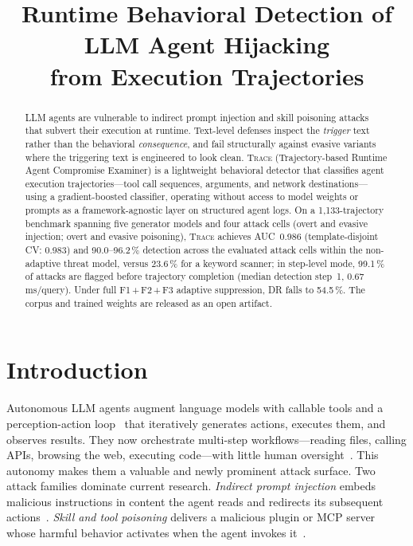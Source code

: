 \documentclass[conference]{IEEEtran}
\title{Runtime Behavioral Detection of LLM Agent Hijacking\\
from Execution Trajectories}
\begin{document}
\maketitle

\begin{abstract}
LLM agents are vulnerable to indirect prompt injection and skill
poisoning attacks that subvert their execution at runtime.
Text-level defenses inspect the \emph{trigger} text rather than the
behavioral \emph{consequence}, and fail structurally against evasive
variants where the triggering text is engineered to look clean.
\textsc{Trace} (Trajectory-based Runtime Agent Compromise
Examiner) is a lightweight behavioral detector that classifies agent
execution trajectories---tool call sequences, arguments, and network
destinations---using a gradient-boosted classifier, operating without
access to model weights or prompts as a framework-agnostic layer on
structured agent logs.
On a 1{,}133-trajectory benchmark spanning five generator models and
four attack cells (overt and evasive injection; overt and evasive
poisoning), \textsc{Trace} achieves AUC~0.986
(template-disjoint CV: 0.983) and 90.0--96.2\,\% detection across
the evaluated attack cells within the non-adaptive threat model,
versus 23.6\,\% for a keyword scanner; in step-level mode, 99.1\,\%
of attacks are flagged before trajectory completion (median detection
step~1, 0.67\,ms/query).  Under full F1\,+\,F2\,+\,F3 adaptive
suppression, DR falls to 54.5\,\%.
The corpus and trained weights are released as an open artifact.
\end{abstract}

\section{Introduction}
\label{sec:intro}

Autonomous LLM agents augment language models with callable tools and
a perception-action loop~\cite{schick2023toolformer,yao2023react,
guo2024survey} that iteratively generates actions, executes them, and
observes results.  They now orchestrate multi-step workflows---reading
files, calling APIs, browsing the web, executing code---with little
human oversight~\cite{wang2024survey}.  This autonomy
makes them a valuable and newly prominent attack surface.  Two attack
families dominate current research.  \emph{Indirect prompt injection}
embeds malicious instructions in content the agent reads and redirects
its subsequent actions~\cite{greshake2023not,perez2022ignore,
zhan2024injectagent}.  \emph{Skill and tool poisoning} delivers a
malicious plugin or MCP server whose harmful behavior activates when
the agent invokes it~\cite{shi2024badagent,yang2024watch}.
\end{document}
